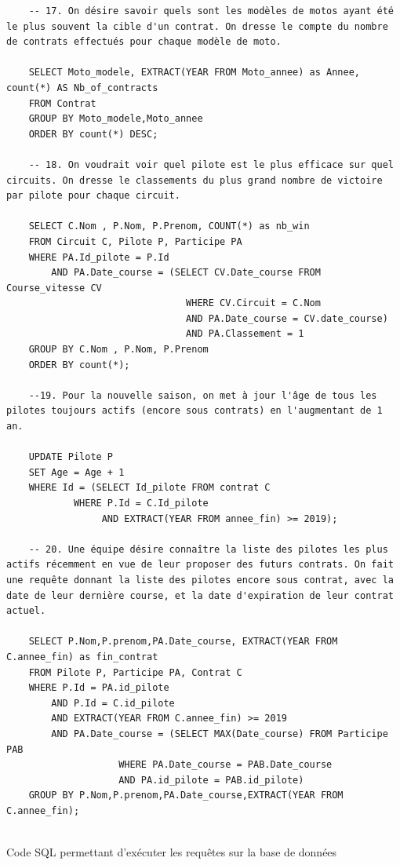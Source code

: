 \documentclass[12pt,a4paper]{article}
\newenvironment{code}{\captionsetup{type=listing}}{}
\begin{document}
\begin{code}
\begin{verbatim}
    -- 17. On désire savoir quels sont les modèles de motos ayant été le plus souvent la cible d'un contrat. On dresse le compte du nombre de contrats effectués pour chaque modèle de moto.

    SELECT Moto_modele, EXTRACT(YEAR FROM Moto_annee) as Annee, count(*) AS Nb_of_contracts
    FROM Contrat
    GROUP BY Moto_modele,Moto_annee
    ORDER BY count(*) DESC;
    
    -- 18. On voudrait voir quel pilote est le plus efficace sur quel circuits. On dresse le classements du plus grand nombre de victoire par pilote pour chaque circuit.

    SELECT C.Nom , P.Nom, P.Prenom, COUNT(*) as nb_win
    FROM Circuit C, Pilote P, Participe PA
    WHERE PA.Id_pilote = P.Id
        AND PA.Date_course = (SELECT CV.Date_course FROM Course_vitesse CV
                                WHERE CV.Circuit = C.Nom
                                AND PA.Date_course = CV.date_course)
                                AND PA.Classement = 1
    GROUP BY C.Nom , P.Nom, P.Prenom
    ORDER BY count(*);
        
    --19. Pour la nouvelle saison, on met à jour l'âge de tous les pilotes toujours actifs (encore sous contrats) en l'augmentant de 1 an.

    UPDATE Pilote P
    SET Age = Age + 1
    WHERE Id = (SELECT Id_pilote FROM contrat C
            WHERE P.Id = C.Id_pilote
                 AND EXTRACT(YEAR FROM annee_fin) >= 2019);
                
    -- 20. Une équipe désire connaître la liste des pilotes les plus actifs récemment en vue de leur proposer des futurs contrats. On fait une requête donnant la liste des pilotes encore sous contrat, avec la date de leur dernière course, et la date d'expiration de leur contrat actuel.

    SELECT P.Nom,P.prenom,PA.Date_course, EXTRACT(YEAR FROM C.annee_fin) as fin_contrat
    FROM Pilote P, Participe PA, Contrat C
    WHERE P.Id = PA.id_pilote
        AND P.Id = C.id_pilote
        AND EXTRACT(YEAR FROM C.annee_fin) >= 2019
        AND PA.Date_course = (SELECT MAX(Date_course) FROM Participe PAB
                    WHERE PA.Date_course = PAB.Date_course
                    AND PA.id_pilote = PAB.id_pilote)
    GROUP BY P.Nom,P.prenom,PA.Date_course,EXTRACT(YEAR FROM C.annee_fin);
    
    \end{verbatim}
    \caption{Code SQL permettant d'exécuter les requêtes sur la base de données}
    \label{lst.request}
\end{code}
\end{document}
